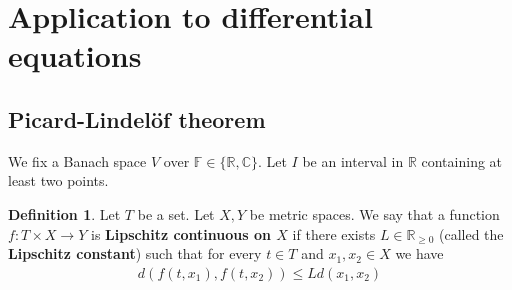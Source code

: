 \documentclass[12pt,b5paper,notitlepage]{article}
\theoremstyle{definition}
\newtheorem{df}{Definition}[section]
\newtheorem{rem}[df]{Remark}
\theoremstyle{plain}
\newcommand{\ovl}{\overline}
\newcommand{\Span}{\mathrm{Span}}
\newcommand{\Cbb}{\mathbb C}
\newcommand{\Zbb}{\mathbb Z}
\newcommand{\Rbb}{\mathbb R}
\newcommand{\Fbb}{\mathbb F}
\newcommand{\eps}{\varepsilon}
\numberwithin{equation}{section}
\begin{document}
\begin{comment}
\begin{rem}
In the above proof, when the infinite dimensional $V$ is reflexive, one can choose $\eps$ to be $0$ thanks to Pb. \ref{lb562}. Therefore, for example, if $V$ is $L^p([0,1],\Fbb)$ or $l^p(\Zbb,\Fbb)$ (where $1<p<+\infty$), one can choose a sequence $(f_n)$ in $\ovl B_V(0,1)$ inductively as follows: First choose $f_{n+1}\in V$ outside $U_n=\Span(f_1,\dots,f_n)$. Then choose $f'_{n+1}\in U_n$ minimizing $\Vert f_{n+1}-f'_{n+1}\Vert$. (This step is very intuitive: in the case that $V$ is an inner product space, $f_{n+1}'$ is just the projection of $f_{n+1}$ to $U_n$.) Replace $f_n$ by $f_{n+1}-f'_{n+1}$. Then scale $f_n$ so that $\Vert f_n\Vert=1$. Then we have $\Vert f_n-f_n\Vert\geq1$ for all $m\neq n$. Since Thm. \ref{lb565} is credited to Riesz, I guess Riesz first figured out this construction for $L^p$ and $l^p$ spaces.
\end{rem}

\end{comment}










\newpage


\section{Application to differential equations}



\subsection{Picard-Lindel\"of theorem}

We fix a Banach space $V$ over $\Fbb\in\{\Rbb,\Cbb\}$. Let $I$ be an interval in $\Rbb$ containing at least two points.


\begin{df}
Let $T$ be a set. Let $X,Y$ be metric spaces. We say that a function $f:T\times X\rightarrow Y$ is \textbf{Lipschitz continuous on $X$}  if there exists $L\in\Rbb_{\geq0}$ (called the \textbf{Lipschitz constant}) such that for every $t\in T$ and $x_1,x_2\in X$ we have
\begin{align*}
d(f(t,x_1),f(t,x_2))\leq Ld(x_1,x_2)
\end{align*}  
\end{df}
\end{document}
